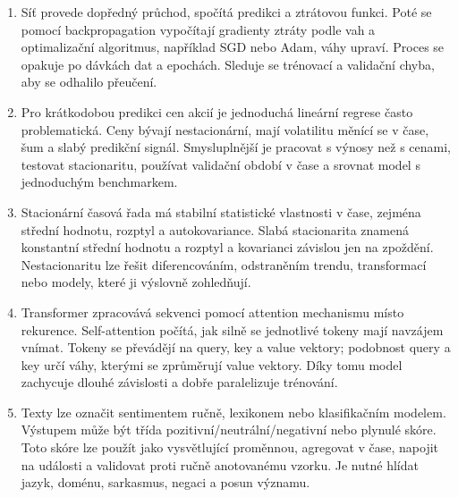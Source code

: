 \documentclass[12pt,a4paper]{article}
\begin{document}
\begin{enumerate}
  Přirozenou volbou je logistická regrese, která modeluje pravděpodobnost jevu v intervalu 0 až 1.
  Alternativou je probit model nebo lineární pravděpodobnostní model. Lineární model je jednoduchý,
  ale může predikovat hodnoty mimo interval a mívá heteroskedasticitu. Logit a probit jsou vhodnější
  pro interpretaci pravděpodobností a klasifikaci.

  \item {}

  Síť provede dopředný průchod, spočítá predikci a ztrátovou funkci. Poté se pomocí backpropagation
  vypočítají gradienty ztráty podle vah a optimalizační algoritmus, například SGD nebo Adam, váhy
  upraví. Proces se opakuje po dávkách dat a epochách. Sleduje se trénovací a validační chyba, aby
  se odhalilo přeučení.

  \item {}

  Pro krátkodobou predikci cen akcií je jednoduchá lineární regrese často problematická. Ceny bývají
  nestacionární, mají volatilitu měnící se v čase, šum a slabý predikční signál. Smysluplnější je
  pracovat s výnosy než s cenami, testovat stacionaritu, používat validační období v čase a srovnat
  model s jednoduchým benchmarkem.

  \item {}

  Stacionární časová řada má stabilní statistické vlastnosti v čase, zejména střední hodnotu, rozptyl
  a autokovariance. Slabá stacionarita znamená konstantní střední hodnotu a rozptyl a kovarianci
  závislou jen na zpoždění. Nestacionaritu lze řešit diferencováním, odstraněním trendu, transformací
  nebo modely, které ji výslovně zohledňují.

  \item {}

  Transformer zpracovává sekvenci pomocí attention mechanismu místo rekurence. Self-attention počítá,
  jak silně se jednotlivé tokeny mají navzájem vnímat. Tokeny se převádějí na query, key a value
  vektory; podobnost query a key určí váhy, kterými se zprůměrují value vektory. Díky tomu model
  zachycuje dlouhé závislosti a dobře paralelizuje trénování.

  \item {}

  Texty lze označit sentimentem ručně, lexikonem nebo klasifikačním modelem. Výstupem může být třída
  pozitivní/neutrální/negativní nebo plynulé skóre. Toto skóre lze použít jako vysvětlující proměnnou,
  agregovat v čase, napojit na události a validovat proti ručně anotovanému vzorku. Je nutné hlídat
  jazyk, doménu, sarkasmus, negaci a posun významu.
\end{enumerate}
\end{document}
